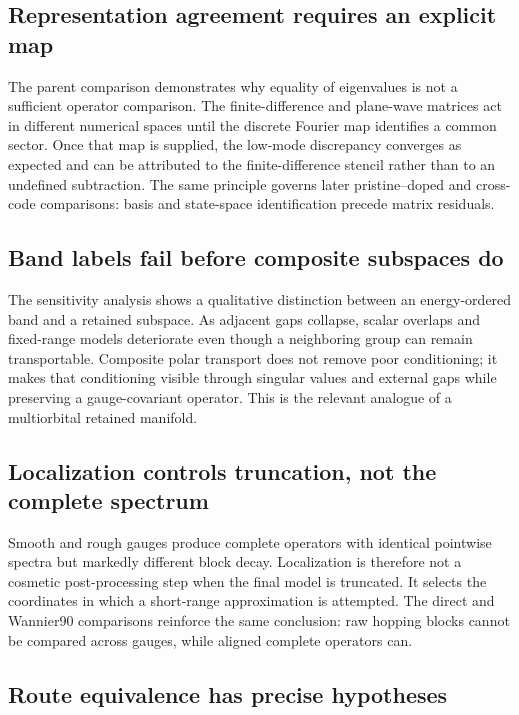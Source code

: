 \subsection{Representation agreement requires an explicit map}

The parent comparison demonstrates why equality of eigenvalues is not a
sufficient operator comparison. The finite-difference and plane-wave matrices
act in different numerical spaces until the discrete Fourier map identifies a
common sector. Once that map is supplied, the low-mode discrepancy converges as
expected and can be attributed to the finite-difference stencil rather than to
an undefined subtraction. The same principle governs later pristine--doped and
cross-code comparisons: basis and state-space identification precede matrix
residuals.

\subsection{Band labels fail before composite subspaces do}

The sensitivity analysis shows a qualitative distinction between an
energy-ordered band and a retained subspace. As adjacent gaps collapse, scalar overlaps and
fixed-range models deteriorate even though a neighboring group can remain
transportable. Composite polar transport does not remove poor conditioning; it
makes that conditioning visible through singular values and external gaps while
preserving a gauge-covariant operator. This is the relevant analogue of a
multiorbital retained manifold.

\subsection{Localization controls truncation, not the complete spectrum}

Smooth and rough gauges produce complete operators with identical pointwise
spectra but markedly different block decay. Localization is therefore not a
cosmetic post-processing step when the final model is truncated. It selects the
coordinates in which a short-range approximation is attempted. The direct and
Wannier90 comparisons reinforce the same conclusion: raw hopping blocks cannot
be compared across gauges, while aligned complete operators can.

\subsection{Route equivalence has precise hypotheses}

